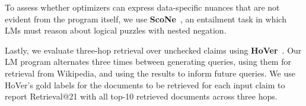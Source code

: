 To assess whether optimizers can express data-specific nuances that are not evident from the program itself, we use \textbf{ScoNe}~\citep{she-etal-2023-scone}, an entailment task in which LMs must reason about logical puzzles with nested negation. %

Lastly, we evaluate three-hop retrieval over unchecked claims using \textbf{HoVer}~\citep{jiang-etal-2020-hover}. Our LM program alternates three times between generating queries, using them for retrieval from Wikipedia, and using the results to inform future queries. We use HoVer's gold labels for the documents to be retrieved for each input claim to report Retrieval@21 with all top-10 retrieved documents across three hops. 








